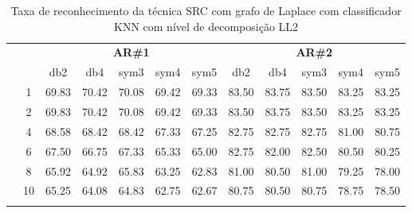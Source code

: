 \begin{table}[htpb]
\begin{tabular}{|c|c|c c c c c|c c c c c|}
\\\midrule
\end{tabular}

\end{table}






\begin{table}[htpb]
	\centering
    \normalsize
	\caption{Taxa de reconhecimento da técnica SRC com grafo de Laplace com classificador KNN com nível de decomposição LL2}
	\begin{tabular}{|c|c|c c c c c|c c c c c|}
\cline{3-12}
\multicolumn{2}{c|}{\multirow{2}{*}{}} & \multicolumn{5}{c|}{\textbf{AR\#1}}  & \multicolumn{5}{c|}{\textbf{AR\#2}} \\\cline{3-12}

\multicolumn{2}{c|}{}  & db2 & db4 & sym3 & sym4 & sym5 & db2 & db4& sym3 & sym4 & sym5 \\\hline

\multicolumn{1}{|c|}{ \multirow{5}{*}{\rotatebox[origin=c]{90}{\textbf{K-vizinhos}}} }
&1	&69.83	&70.42	&70.08	&69.42	&69.33	&83.50	&83.75	&83.50	&83.25	&83.25\\\cline{2-12}
&2	&69.83	&70.42	&70.08	&69.42	&69.33	&83.50	&83.75	&83.50	&83.25	&83.25\\\cline{2-12}
&4	&68.58	&68.42	&68.42	&67.33	&67.25	&82.75	&82.75	&82.75	&81.00	&80.75\\\cline{2-12}
&6	&67.50	&66.75	&67.33	&65.33	&65.00	&82.75	&82.00	&82.50	&80.50	&80.25\\\cline{2-12}
&8	&65.92	&64.92	&65.83	&63.25	&62.83	&81.00	&80.50	&81.00	&79.25	&78.00\\\cline{2-12}
&10	&65.25	&64.08	&64.83	&62.75	&62.67	&80.75	&80.50	&80.75	&78.75	&78.50%
  
\\ \midrule
\multicolumn{12}{c}{}\\ 





\end{tabular}
\end{table}
